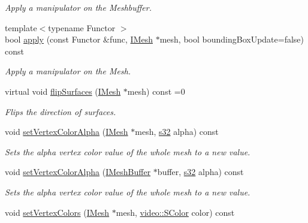 \begin{DoxyCompactItemize}
\begin{DoxyCompactList}\small\item\em Apply a manipulator on the Meshbuffer. \end{DoxyCompactList}\item 
{\footnotesize template$<$typename Functor $>$ }\\bool \hyperlink{classirr_1_1scene_1_1IMeshManipulator_a5a69b634835f4314d93a192758f910da}{apply} (const Functor \&func, \hyperlink{classirr_1_1scene_1_1IMesh}{I\+Mesh} $\ast$mesh, bool bounding\+Box\+Update=false) const
\begin{DoxyCompactList}\small\item\em Apply a manipulator on the Mesh. \end{DoxyCompactList}\item 
virtual void \hyperlink{classirr_1_1scene_1_1IMeshManipulator_a7194e8a44bfe3a6444826f346c4104ff}{flip\+Surfaces} (\hyperlink{classirr_1_1scene_1_1IMesh}{I\+Mesh} $\ast$mesh) const =0
\begin{DoxyCompactList}\small\item\em Flips the direction of surfaces. \end{DoxyCompactList}\item 
void \hyperlink{classirr_1_1scene_1_1IMeshManipulator_a96391fbe81aaddf8afa56b5b13da66e2}{set\+Vertex\+Color\+Alpha} (\hyperlink{classirr_1_1scene_1_1IMesh}{I\+Mesh} $\ast$mesh, \hyperlink{namespaceirr_ac66849b7a6ed16e30ebede579f9b47c6}{s32} alpha) const
\begin{DoxyCompactList}\small\item\em Sets the alpha vertex color value of the whole mesh to a new value. \end{DoxyCompactList}\item 
void \hyperlink{classirr_1_1scene_1_1IMeshManipulator_af69cbfcfd9286ccec2c6088a09dbe4a3}{set\+Vertex\+Color\+Alpha} (\hyperlink{classirr_1_1scene_1_1IMeshBuffer}{I\+Mesh\+Buffer} $\ast$buffer, \hyperlink{namespaceirr_ac66849b7a6ed16e30ebede579f9b47c6}{s32} alpha) const
\begin{DoxyCompactList}\small\item\em Sets the alpha vertex color value of the whole mesh to a new value. \end{DoxyCompactList}\item 
void \hyperlink{classirr_1_1scene_1_1IMeshManipulator_a72bc31cb9468480698277f0f164e71ee}{set\+Vertex\+Colors} (\hyperlink{classirr_1_1scene_1_1IMesh}{I\+Mesh} $\ast$mesh, \hyperlink{classirr_1_1video_1_1SColor}{video\+::\+S\+Color} color) const

\end{DoxyCompactItemize}
